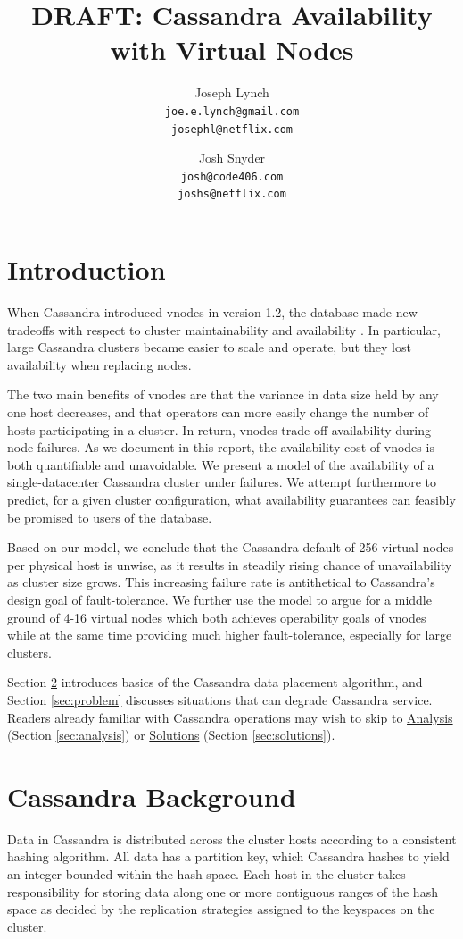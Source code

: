 \documentclass{article}
\title{DRAFT: Cassandra Availability with Virtual Nodes}
\author{
  Joseph Lynch\\
  \texttt{joe.e.lynch@gmail.com}\\
  \texttt{josephl@netflix.com}
  \and
  Josh Snyder\\
  \texttt{josh@code406.com}\\
  \texttt{joshs@netflix.com}
}
\begin{document}
\maketitle
\section{Introduction}
When Cassandra introduced vnodes in version 1.2, the database made new tradeoffs
with respect to cluster maintainability and availability \cite{vnodes}. In particular,
large Cassandra clusters became easier to scale and operate, but they lost
availability when replacing nodes.

The two main benefits of vnodes are that the variance in data size held by any
one host decreases, and that operators can more easily change the number of
hosts participating in a cluster. In return, vnodes trade off availability during
node failures. As we document in this report, the availability cost of vnodes is
both quantifiable and unavoidable. We present a model of the availability of a
single-datacenter Cassandra cluster under failures. We attempt furthermore
to predict, for a given cluster configuration, what availability guarantees
can feasibly be promised to users of the database.

Based on our model, we conclude that the Cassandra default of 256 virtual nodes
per physical host is unwise, as it results in steadily rising chance of
unavailability as cluster size grows. This increasing failure rate is
antithetical to Cassandra's design goal of fault-tolerance. We further use
the model to argue for a middle ground of 4-16 virtual nodes which both achieves
operability goals of vnodes while at the same time providing much higher
fault-tolerance, especially for large clusters.

Section \ref{sec:background} introduces basics of the Cassandra data placement
algorithm, and Section \ref{sec:problem} discusses situations that can degrade
Cassandra service. Readers already familiar with Cassandra operations may wish
to skip to \hyperref[sec:analysis]{Analysis} (Section \ref{sec:analysis}) or
\hyperref[sec:solutions]{Solutions} (Section \ref{sec:solutions}).

\section{Cassandra Background}
\label{sec:background}
Data in Cassandra is distributed across the cluster hosts according to a
consistent hashing algorithm. All data has a partition key, which Cassandra
hashes to yield an integer bounded within the hash space. Each host in the
cluster takes responsibility for storing data along one or more contiguous
ranges of the hash space as decided by the replication strategies assigned
to the keyspaces on the cluster.
\end{document}
